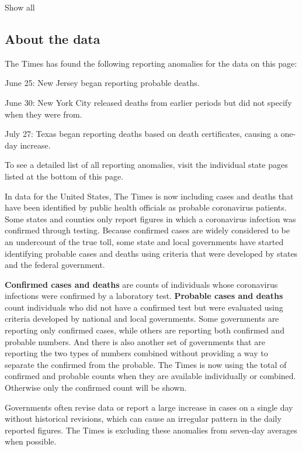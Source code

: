 Show all

\hypertarget{about-the-data}{%
\subsection{About the data}\label{about-the-data}}

The Times has found the following reporting anomalies for the data on
this page:

June 25: New Jersey began reporting probable deaths.

June 30: New York City released deaths from earlier periods but did not
specify when they were from.

July 27: Texas began reporting deaths based on death certificates,
causing a one-day increase.

To see a detailed list of all reporting anomalies, visit the individual
state pages listed at the bottom of this page.

In data for the United States, The Times is now including cases and
deaths that have been identified by public health officials as probable
coronavirus patients. Some states and counties only report figures in
which a coronavirus infection was confirmed through testing. Because
confirmed cases are widely considered to be an undercount of the true
toll, some state and local governments have started identifying probable
cases and deaths using criteria that were developed by states and the
federal government.

\textbf{Confirmed cases and deaths} are counts of individuals whose
coronavirus infections were confirmed by a laboratory test.
\textbf{Probable cases and deaths} count individuals who did not have a
confirmed test but were evaluated using criteria developed by national
and local governments. Some governments are reporting only confirmed
cases, while others are reporting both confirmed and probable numbers.
And there is also another set of governments that are reporting the two
types of numbers combined without providing a way to separate the
confirmed from the probable. The Times is now using the total of
confirmed and probable counts when they are available individually or
combined. Otherwise only the confirmed count will be shown.

Governments often revise data or report a large increase in cases on a
single day without historical revisions, which can cause an irregular
pattern in the daily reported figures. The Times is excluding these
anomalies from seven-day averages when possible.


